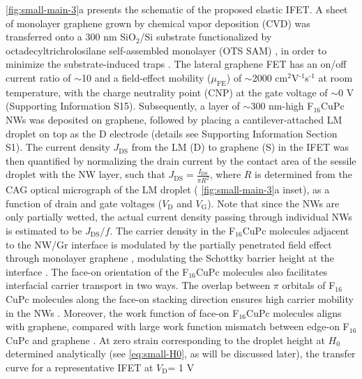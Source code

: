  \autoref{fig:small-main-3}a presents the schematic of the proposed elastic
IFET. A sheet of monolayer graphene grown by chemical vapor
deposition (CVD) was transferred onto a 300 nm SiO\(_{\text{2}}\)/Si substrate
functionalized by octadecyltrichrolosilane self-assembled monolayer
(OTS SAM) \cite{Yan_2011}, in order to minimize the substrate-induced
traps \cite{Wang_2011_quanti_doping_gr}.  The lateral graphene FET has an on/off current
ratio of \(\sim\)10 and a field-effect mobility (\(\mu_{\mathrm{FE}}\))
of \(\sim\)2000 cm\(^{\text{2}}\)V\(^{\text{-1}}\)s\(^{\text{-1}}\) at room temperature, with the charge
neutrality point (CNP) at the gate voltage of \(\sim\)0 V (Supporting Information  S15). Subsequently, a layer of \(\sim\)300 nm-high
F\(_{\text{16}}\)CuPc NWs was deposited on graphene, followed by placing a
cantilever-attached LM droplet on top as the D electrode (details see
Supporting Information Section S1).  The current density
\(J_{\mathrm{DS}}\) from the LM (D) to graphene (S) in the IFET was
then quantified by normalizing the drain current by the contact area
of the sessile droplet with the NW layer, such that \(J_{\mathrm{DS}}
 = {\displaystyle \frac{I_{\mathrm{DS}}}{\pi R^{2}}}\), where \(R\) is
determined from the CAG optical micrograph of the LM droplet (
\autoref{fig:small-main-3}a inset), as a function of drain and gate voltages
(\(V_{\mathrm{D}}\) and \(V_{\mathrm{G}}\)). Note that since the NWs are
only partially wetted, the actual current density passing through
individual NWs is estimated to be \(J_{\mathrm{DS}}/f\). The carrier
density in the F\(_{\text{16}}\)CuPc molecules adjacent to the NW/Gr interface
is modulated by the partially penetrated field effect through
monolayer graphene , modulating the
Schottky barrier height at the interface \cite{Yang_2012_Barristor}. The
face-on orientation of the F\(_{\text{16}}\)CuPc molecules also facilitates
interfacial carrier transport in two ways. The overlap between \(\pi\)
orbitals of F\(_{\text{16}}\)CuPc molecules along the face-on stacking direction
ensures high carrier mobility in the NWs \cite{Bao_1998_FCuPC}. Moreover, the
work function of face-on F\(_{\text{16}}\)CuPc molecules aligns with graphene,
compared with large work function mismatch between edge-on F\(_{\text{16}}\)CuPc
and graphene \cite{Mao_2010_F16_level_orien,Ren_2011_DFT_CuPc_epi_gr}. At
zero strain corresponding to the droplet height at \(H_{0}\) determined
analytically (see  \autoref{eq:small-H0}, as will be discussed later), the
transfer curve for a representative IFET at \(V_{\mathrm{D}}\)= 1 V

